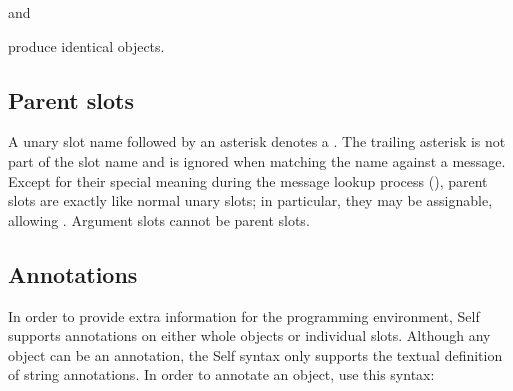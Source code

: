 \documentclass[letterpaper,10pt,english]{sphinxmanual}
\begin{document}
\begin{sphinxVerbatim}[commandchars=\\\{\}]
 
             
                
 
\end{sphinxVerbatim}

and

\begin{sphinxVerbatim}[commandchars=\\\{\}]
 
          
                 
 
\end{sphinxVerbatim}

produce identical objects.


\subsection{Parent slots}
\label{\detokenize{langref:parent-slots}}\label{\detokenize{langref:index-40}}\label{\detokenize{langref:pp-parent-slots}}
A unary slot name followed by an asterisk denotes a . The trailing asterisk is not part of the slot name and is ignored when matching the name against a message. Except for their special meaning during the message lookup process ({\hyperref[\detokenize{langref:pp-lookup-algorithm}]{}}), parent slots are exactly like normal unary slots; in particular, they may be assignable, allowing . Argument slots cannot be parent slots.


\subsection{Annotations}
\label{\detokenize{langref:annotations}}\label{\detokenize{langref:index-42}}
In order to provide extra information for the programming environment, Self supports annotations on either whole objects or individual slots. Although any object can be an annotation, the Self syntax only supports the textual definition of string annotations. In order to annotate an object, use this syntax:
\end{document}
